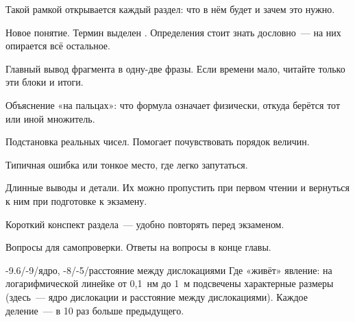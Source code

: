 \begin{orientir}
Такой рамкой открывается каждый раздел: что в нём будет и зачем это нужно.
\end{orientir}

\begin{opredelenie}
Новое понятие. Термин выделен . Определения стоит знать
дословно~— на них опирается всё остальное.
\end{opredelenie}

\begin{keyeq*}
\end{keyeq*}

\begin{glavnoe}
Главный вывод фрагмента в одну-две фразы. Если времени мало, читайте
только эти блоки и итоги.
\end{glavnoe}

\begin{smysl}
Объяснение «на пальцах»: что формула означает физически, откуда берётся
тот или иной множитель.
\end{smysl}

\begin{primer*}
Подстановка реальных чисел. Помогает почувствовать порядок величин.
\end{primer*}

\begin{vnimanie}
Типичная ошибка или тонкое место, где легко запутаться.
\end{vnimanie}

\begin{podrobnee}
Длинные выводы и детали. Их можно пропустить при первом чтении и вернуться
к ним при подготовке к экзамену.
\end{podrobnee}

\begin{itogi}
Короткий конспект раздела~— удобно повторять перед экзаменом.
\end{itogi}

\begin{proverka}
\item Вопросы для самопроверки. Ответы на вопросы в конце главы.
\end{proverka}

\begin{masshtab}[дислокация]{-9.6/-9/{ядро}, -8/-5/{расстояние между дислокациями}}
Где «живёт» явление: на логарифмической линейке от 0,1~нм до 1~м
подсвечены характерные размеры (здесь~— ядро дислокации и расстояние
между дислокациями). Каждое деление~— в 10 раз больше предыдущего.
\end{masshtab}

